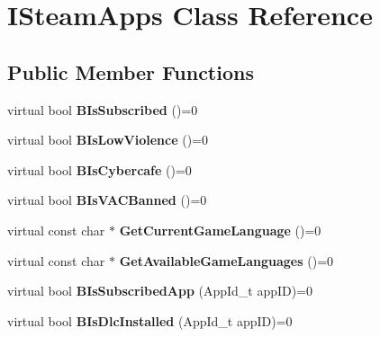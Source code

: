 \hypertarget{classISteamApps}{}\section{I\+Steam\+Apps Class Reference}
\label{classISteamApps}
\subsection*{Public Member Functions}
\begin{DoxyCompactItemize}
\item 
\hypertarget{classISteamApps_a46b1314886cad0fc36b86a2e417c1932}{}virtual bool {\bfseries B\+Is\+Subscribed} ()=0\label{classISteamApps_a46b1314886cad0fc36b86a2e417c1932}

\item 
\hypertarget{classISteamApps_abf824c3b654c953f11518de5afc2e6ab}{}virtual bool {\bfseries B\+Is\+Low\+Violence} ()=0\label{classISteamApps_abf824c3b654c953f11518de5afc2e6ab}

\item 
\hypertarget{classISteamApps_a3c090ea4660143a30c76ee3571122afa}{}virtual bool {\bfseries B\+Is\+Cybercafe} ()=0\label{classISteamApps_a3c090ea4660143a30c76ee3571122afa}

\item 
\hypertarget{classISteamApps_a0a3eeb3fbc774390d8652605527dadac}{}virtual bool {\bfseries B\+Is\+V\+A\+C\+Banned} ()=0\label{classISteamApps_a0a3eeb3fbc774390d8652605527dadac}

\item 
\hypertarget{classISteamApps_ada18d64c49d8139f85f00ee5cfc03d1b}{}virtual const char $\ast$ {\bfseries Get\+Current\+Game\+Language} ()=0\label{classISteamApps_ada18d64c49d8139f85f00ee5cfc03d1b}

\item 
\hypertarget{classISteamApps_a3ecdf69a129d1f58d8d1e11b38e534eb}{}virtual const char $\ast$ {\bfseries Get\+Available\+Game\+Languages} ()=0\label{classISteamApps_a3ecdf69a129d1f58d8d1e11b38e534eb}

\item 
\hypertarget{classISteamApps_a08d3b10f8c23035283448541211e9774}{}virtual bool {\bfseries B\+Is\+Subscribed\+App} (App\+Id\+\_\+t app\+I\+D)=0\label{classISteamApps_a08d3b10f8c23035283448541211e9774}

\item 
\hypertarget{classISteamApps_a183d85a7b9c38ec921e980d2ecce2dac}{}virtual bool {\bfseries B\+Is\+Dlc\+Installed} (App\+Id\+\_\+t app\+I\+D)=0\label{classISteamApps_a183d85a7b9c38ec921e980d2ecce2dac}


\end{DoxyCompactItemize}
